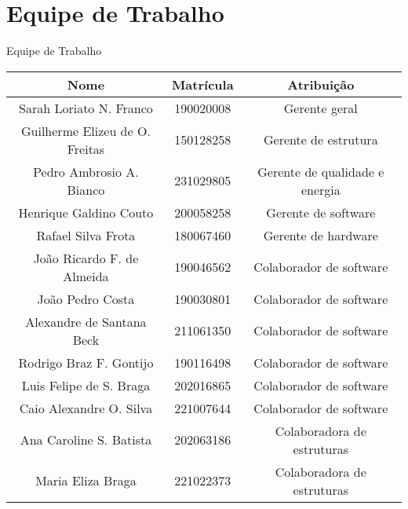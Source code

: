 \chapter{Equipe de Trabalho}

\begin{quadro}[htb]
  \caption{\label{quadro_equipe_trabalho}Equipe de Trabalho}

  \begin{tabular}{|c|c|c|}
    \hline
    \textbf{Nome} & \textbf{Matrícula} & \textbf{Atribuição} \\
    \hline
    Sarah Loriato N. Franco & 190020008 & Gerente geral \\
    \hline
    Guilherme Elizeu de O. Freitas & 150128258 & Gerente de estrutura \\
    \hline
    Pedro Ambrosio A. Bianco & 231029805 & Gerente de qualidade e energia \\
    \hline
    Henrique Galdino Couto & 200058258 & Gerente de software \\
    \hline
    Rafael Silva Frota & 180067460 & Gerente de hardware \\
    \hline
    João Ricardo F. de Almeida & 190046562 & Colaborador de software \\
    \hline
    João Pedro Costa & 190030801 & Colaborador de software \\
    \hline
    Alexandre de Santana Beck & 211061350 & Colaborador de software \\
    \hline
    Rodrigo Braz F. Gontijo & 190116498 & Colaborador de software \\
    \hline
    Luis Felipe de S. Braga & 202016865 & Colaborador de software \\
    \hline
    Caio Alexandre O. Silva & 221007644 & Colaborador de software \\
    \hline
    Ana Caroline S. Batista & 202063186 & Colaboradora de estruturas \\
    \hline
    Maria Eliza Braga & 221022373 & Colaboradora de estruturas \\
    \hline
  \end{tabular}

\end{quadro}

